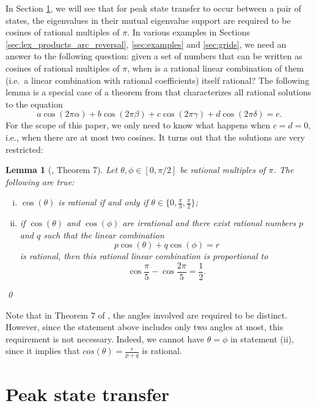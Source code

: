 \documentclass{article}
\newtheorem{lemma}[theorem]{Lemma}
\numberwithin{equation}{section}
\begin{document}
In Section \ref{sec:peakst}, we will see that for peak state transfer to occur between a pair of states, the eigenvalues in their mutual eigenvalue support are required to be cosines of rational multiples of $\pi$. In various examples in Sections \ref{sec:lex_products_arc_reversal}, \ref{sec:examples} and \ref{sec:grids}, we need an answer to the following question: given a set of numbers that can be written as cosines of rational multiples of $\pi$, when is a rational linear combination of them (i.e.\ a linear combination with rational coefficients) itself rational? The following lemma is a special case of a theorem from \cite{ConJon1976} that characterizes all rational solutions to the equation
\[
a\cos(2\pi \alpha) + b\cos(2\pi \beta) + c\cos(2\pi \gamma) + d\cos(2\pi \delta) = e.
\]
For the scope of this paper, we only need to know what happens when $c = d = 0$, i.e., when there are at most two cosines. It turns out that the solutions are very restricted: 
\begin{lemma}[\cite{ConJon1976}, Theorem 7]
\label{lem:conway_jones}
Let $\theta, \phi \in [0,\pi/2]$ be rational multiples of $\pi$. The following are true:
\begin{enumerate}[(i)]
\item $\cos(\theta)$ is rational if and only if $\theta \in \{0, \frac{\pi}{3},\frac{\pi}{2}\}$;
\item if $\cos(\theta)$ and $\cos(\phi)$ are irrational and there exist rational numbers $p$ and $q$ such that the linear combination
\[
p\cos(\theta) + q\cos(\phi) = r
\]
is rational, then this rational linear combination is proportional to
\begin{equation}
\label{eq:conway_jones_pi5}
\cos\frac{\pi}{5} - \cos\frac{2\pi}{5} = \frac{1}{2}.
\end{equation}
\end{enumerate}
\qed
\end{lemma}
\noindent Note that in Theorem 7 of \cite{ConJon1976}, the angles involved are required to be distinct. However, since the statement above includes only two angles at most, this requirement is not necessary. Indeed, we cannot have $\theta = \phi$ in statement (ii), since it implies that $cos(\theta) = \frac{r}{p+q}$ is rational.









\section{Peak state transfer} \label{sec:peakst}
\end{document}
